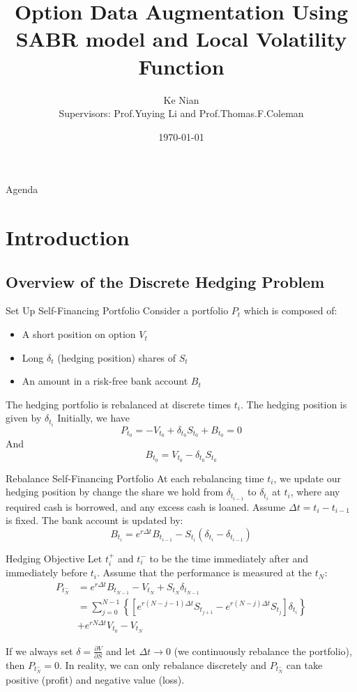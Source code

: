 \documentclass[10pt,table,mathserif]{beamer}
\title[Option Data Augmentation]%
{Option Data Augmentation Using SABR model and Local Volatility Function}
\author[Ke Nian ] %
{ Ke Nian\\
 Supervisors: Prof.Yuying Li and Prof.Thomas.F.Coleman
}
\institute[
  David R. Cheriton School of Computer Science, University of Waterloo
] %
{%
  David R. Cheriton School of Computer Science,\\
  University of Waterloo,\\
  Waterloo, Canada
}
\date{\today}
\begin{document}
\begin{frame}[plain] %
  \titlepage
\end{frame}

\begin{frame}{Agenda}{}
\tableofcontents
\end{frame}
\section{Introduction}
\subsection{Overview of the Discrete Hedging Problem}
\begin{frame}{Set Up Self-Financing Portfolio}
Consider a portfolio $P_{t}$ which is composed of:
\begin{itemize}
	\item A short position on option $V_t$
	\item Long $\delta_t$ (hedging position) shares of $S_t$
	\item An amount in a risk-free bank account $B_t$
\end{itemize}
The hedging portfolio is rebalanced at discrete times $t_i$. The hedging position is given by $\delta_{t_i}$
Initially, we have
\[
P_{t_0}=  -V_{t_0}+\delta_{t_0} S_{t_0}+ B_{t_0}=0
\]
And
\[
B_{t_0}=V_{t_0}-\delta_{t_0} S_{t_0}
\]
\end{frame}

\begin{frame}{Rebalance Self-Financing Portfolio}
At each rebalancing time $t_i$, we update our hedging position by change the share we hold from $\delta_{t_{i-1}}$ to $\delta_{t_i}$ at $t_i$, where any required cash is borrowed, and any excess cash is loaned. Assume $\Delta t=t_{i}-t_{i-1}$ is fixed.
The bank account is updated by:
\[
B_{t_{i}}=e^{r \Delta t} B_{t_{i-1}}-S_{t_i}(\delta_{t_i}-\delta_{t_{i-1}})
\]
\end{frame}


\begin{frame}{Hedging Objective}
Let $t_i^+$ and $t_i^-$  to be the time immediately after  and immediately before $t_i$. Assume that the performance is measured at the $t_N$:
\[ \begin{split}
P_{t_N^-}&=e^{r \Delta t} B_{t_{N-1}}- V_{t_N}+ S_{t_N} \delta_{t_{N-1}}  \\
&=\sum_{j=0}^{N-1}\left\{ \left[e^{r (N-j-1) \Delta t} S_{t_{j+1}}-e^{r (N-j) \Delta t}S_{t_{j}}\right] \delta_{t_i} \right\}\\
&+e^{r N \Delta t} V_{t_0}-V_{t_N}
\end{split}
\]

If we always set $\delta=\frac{\partial V}{\partial S}$ and let $\Delta t \rightarrow 0$ (we continuously rebalance the portfolio), then $P_{t_N^-}=0$. In reality, we can only rebalance discretely and  $P_{t_N^-}$ can take positive (profit) and negative value (loss).
\end{frame}
\end{document}
